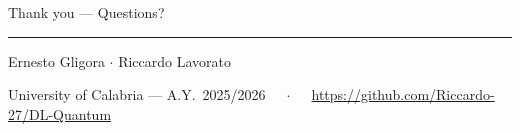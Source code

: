 \documentclass[aspectratio=169,10pt]{beamer}
\begin{document}
{
\begin{frame}[plain]
    \vspace{2.1cm}
    {\rmfamily\fontsize{30}{36}\selectfont\color{white}Thank you --- Questions?}\par\vspace{0.42cm}
    {\color{accentbronze}\rule{3.8cm}{0.7pt}}\par\vspace{0.38cm}
    {\fontsize{10.5}{13}\selectfont\color{white}Ernesto Gligora $\cdot$ Riccardo Lavorato}\par\vspace{0.18cm}
    {\fontsize{8.5}{11}\selectfont\color{rulegray}University of Calabria --- A.Y.\ 2025/2026 $\quad\cdot\quad$ \url{https://github.com/Riccardo-27/DL-Quantum}}
\end{frame}
}
\end{document}
